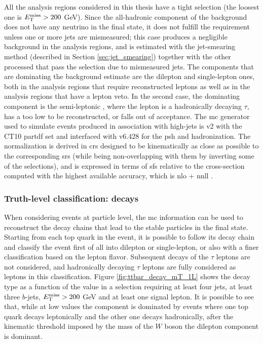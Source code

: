 All the analysis regions considered in this thesis have a tight \met selection (the loosest one is $E_{\rm T}^{\mathrm{miss}} > 200$ GeV). Since the all-hadronic component 
of the \ttbar background does not have any neutrino in the final state, it does not fulfill the \met requirement unless one or more jets are mismeasured; 
this case produces a negligible background in the analysis regions, and 
is estimated with the jet-smearing method (described in Section \ref{sec:jet_smearing}) together with the other processed that pass the selection due to mismeasured jets.
The \ttbar components that are dominating the background estimate are the dilepton and single-lepton ones, both in the analysis regions that require reconstructed leptons as well as in the analysis regions that have a lepton veto.
In the second case, the dominating component is the semi-leptonic \ttbar, where the lepton is a hadronically decaying $\tau$, has a \pt too low to be reconstructed, or falls out of acceptance. 
The \gls{mc} generator used to simulate \ttbar events produced in association with high-\pt jets is \PowhegBox v2 with the CT10 \gls{partdf} set \cite{Lai:2010vv} and interfaced with \PY v6.428 \cite{Sjostrand:2006za} for the \gls{psh} and hadronization. 
The normalization is derived in \glspl{cr} designed to be kinematically as close as possible to the corresponding \glspl{sr} (while being non-overlapping with them by inverting some of the selections), and is expressed in terms of \glspl{sf} relative to the cross-section computed with the highest
available accuracy, which is \gls{nlo} + \gls{nnll} \cite{Czakon:2011xx}.

\subsubsection*{Truth-level classification: \ttbar decays}

When considering events at particle level,
the \gls{mc} information can be used to reconstruct the decay chains that lead to the stable particles in the final state. 
Starting from each top quark in the event, it is possible to follow its decay chain and classify the event first of all into dilepton or single-lepton, or also with a finer classification based on the lepton flavor.  
Subsequent decays of the $\tau$ leptons are not considered, and hadronically decaying $\tau$ leptons are fully considered as leptons in this classification. 
Figure \ref{fig:ttbar_decay_mT_1L} shows the \ttbar decay type as a function of the \mt value  in a selection requiring at least four jets, at least three $b$-jets, $E_{\rm T}^{\mathrm{miss}}>200$ GeV and at least one signal lepton. It is possible to see that, while at low \mt values the \ttbar component is dominated by events where one top quark decays leptonically and the other one decays hadronically, after the kinematic threshold imposed by the mass of the $W$ boson the dilepton component is dominant. 

